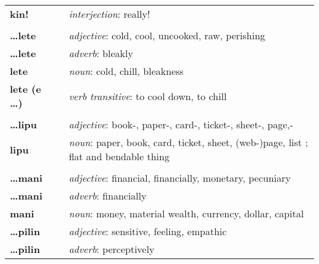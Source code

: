 \begin{supertabular}{p{2,5cm}|ll}
    \textbf{kin!}             &  & \textit{interjection}: really!                                                              \\
                              &  &                                                                                             \\
    \textbf{\dots lete}       &  & \textit{adjective}: cold, cool, uncooked, raw, perishing                                    \\
    \textbf{\dots lete}       &  & \textit{adverb}: bleakly                                                                    \\
    \textbf{lete}             &  & \textit{noun}: cold, chill, bleakness                                                       \\
    \textbf{lete (e \dots)}   &  & \textit{verb transitive}: to cool down, to chill                                            \\
                              &  &                                                                                             \\
    \textbf{\dots lipu}       &  & \textit{adjective}: book-, paper-, card-, ticket-, sheet-, page,-                           \\
    \textbf{lipu}             &  & \textit{noun}: paper, book, card, ticket, sheet, (web-)page, list ; flat and bendable thing \\
                              &  &                                                                                             \\
    \textbf{\dots mani}       &  & \textit{adjective}: financial, financially, monetary, pecuniary                             \\
    \textbf{\dots mani}       &  & \textit{adverb}: financially                                                                \\
    \textbf{mani}             &  & \textit{noun}: money, material wealth, currency, dollar, capital                            \\
    \textbf{\dots pilin}      &  & \textit{adjective}: sensitive, feeling, empathic                                            \\
    \textbf{\dots pilin}      &  & \textit{adverb}: perceptively                                                               \\

\end{supertabular}
